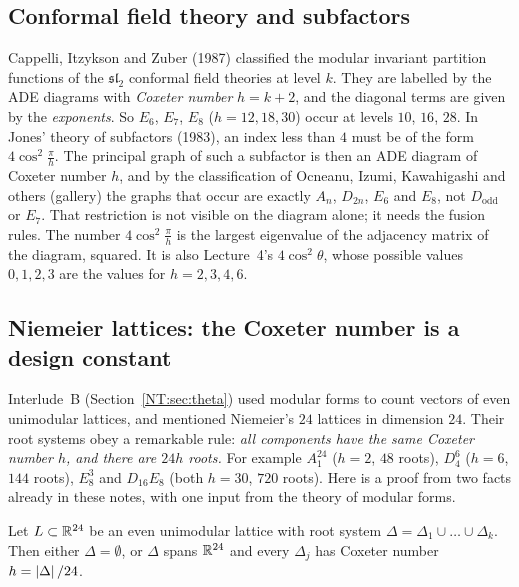 \subsection*{Conformal field theory and subfactors}
Cappelli, Itzykson and Zuber (1987) classified the modular invariant partition functions of the
$\mathfrak{sl}_2$ conformal field theories at level $k$. They are labelled by the ADE diagrams with
\emph{Coxeter number} $h=k+2$, and the diagonal terms are given by the \emph{exponents}. So $E_6$, $E_7$,
$E_8$ ($h=12,18,30$) occur at levels $10$, $16$, $28$. In Jones' theory of subfactors (1983), an index less than $4$ must be
of the form $4\cos^2\frac\pi h$. The principal graph of such a subfactor is then an ADE diagram of
Coxeter number $h$, and by the classification of Ocneanu, Izumi, Kawahigashi and others (gallery) the
graphs that occur are exactly $A_n$, $D_{2n}$, $E_6$ and $E_8$, not $D_{\mathrm{odd}}$ or $E_7$. That
restriction is not visible on the diagram alone; it needs the fusion rules. The number $4\cos^2\frac\pi h$ is the largest eigenvalue of the
adjacency matrix of the diagram, squared. It is also Lecture~4's $4\cos^2\theta$, whose possible values
$0,1,2,3$ are the values for $h=2,3,4,6$.

\subsection*{Niemeier lattices: the Coxeter number is a design constant}
Interlude~B (Section~\ref{NT:sec:theta}) used modular forms to count vectors of even unimodular lattices,
and mentioned Niemeier's $24$ lattices in dimension $24$. Their root systems obey a remarkable rule:
\emph{all components have the same Coxeter number $h$, and there are $24h$ roots.} For example
$A_1^{24}$ ($h=2$, $48$ roots), $D_4^6$ ($h=6$, $144$ roots), $E_8^3$ and $D_{16}E_8$ (both $h=30$, $720$ roots).
Here is a proof from two facts already in these notes, with one input from the theory of modular forms.

\begin{proposition}[Venkov]\label{DYN:prop:venkov}
Let $L\subset\mathbb{R}^{24}$ be an even unimodular lattice with root system $\Delta=\Delta_1\cup\dots\cup\Delta_k$.
Then either $\Delta=\emptyset$, or $\Delta$ spans $\mathbb{R}^{24}$ and every $\Delta_j$ has Coxeter number
$h=\left\lvert \Delta \right\rvert/24$.
\end{proposition}

